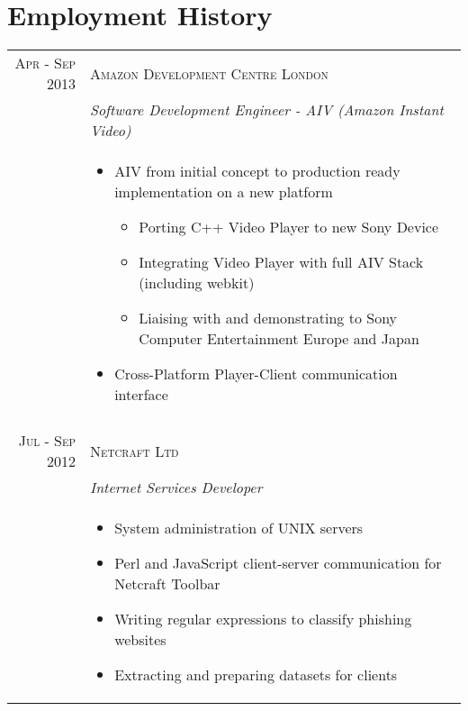 \section*{Employment History}

\begin{tabular}{r|p{11cm}}

\textsc{Apr - Sep 2013} & \textsc{Amazon Development Centre London}\\ 
& \emph{Software Development Engineer - AIV (Amazon Instant Video)}\\
& \begin{footnotesize}
\begin{itemize}
	\item AIV from initial concept to production ready implementation on a new platform
		\begin{itemize}
		\item Porting C++ Video Player to new Sony Device
		\item Integrating Video Player with full AIV Stack (including webkit)
		\item Liaising with and demonstrating to Sony Computer Entertainment Europe and Japan
		\end{itemize}
	\item Cross-Platform Player-Client communication interface
\end{itemize}
\end{footnotesize}\\

\multicolumn{2}{c}{} \\


\textsc{Jul - Sep 2012} & \textsc{Netcraft Ltd}\\ 
& \emph{Internet Services Developer}\\
& \begin{footnotesize}
\begin{itemize}
	\item System administration of UNIX servers
	\item Perl and JavaScript client-server communication for Netcraft Toolbar
	\item Writing regular expressions to classify phishing websites
	\item Extracting and preparing datasets for clients
\end{itemize}
\end{footnotesize}\\


\end{tabular}
